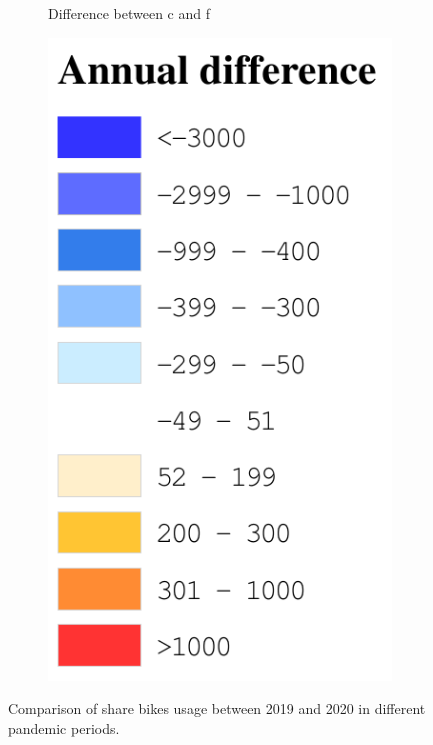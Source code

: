 \documentclass[ijgi,submit,moreauthors,pdftex]{Definitions/mdpi}
\begin{document}
\begin{figure}[!ht]
\begin{subfigure}{.28\textwidth}
\begin{tikzpicture}[inner sep = 0pt]
        \end{tikzpicture}
        \caption{Difference between c and f}
        \label{fig:p_c_dif}
    \end{subfigure}
    \begin{subfigure}{.14\textwidth}
        \includegraphics[width=\textwidth]{Figures/AnnualDifLegend-eps-converted-to.pdf}
    \end{subfigure}
    \caption{Comparison of share bikes usage between 2019 and 2020 in different pandemic periods.}
    \label{fig:compare_2019_and_2020}
\end{figure}
\end{document}
